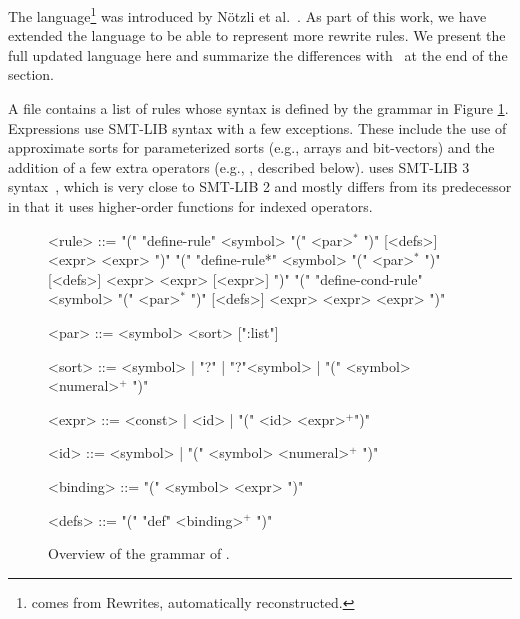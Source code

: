 The \dsl language\footnote{\dsl comes from {\sc R}ewrites, {\sc a}utomatically
{\sc re}constructed.} was introduced by N\"otzli et al.~\cite{notzli2022reconstructing}.
As part of this work, we have extended the language to be able to
represent more rewrite rules.  We present the full updated language here and
summarize the differences with~\cite{notzli2022reconstructing} at the end of the
section.

A \dsl file contains a list of rules whose syntax is defined by the grammar in Figure \ref{fig:grammar}.
Expressions use SMT-LIB syntax with a few exceptions.
These include the use of approximate sorts for parameterized sorts (e.g.,
arrays and bit-vectors) and the addition of a few extra operators (e.g.,
, described below). \dsl uses SMT-LIB 3
syntax~\cite{smtlib3}, which is very close to SMT-LIB 2 and mostly differs from
its predecessor in that it uses higher-order functions for indexed operators. 

\begin{figure}[t]
    \renewcommand{\ulitleft}{\small \ttfamily \bfseries}
    \renewcommand{\ulitright}{}
    \begin{grammar}
      <rule> ::= "(" "define-rule" <symbol> "(" <par>$^*$ ")" [<defs>] <expr> <expr> ")"
      \alt "(" "define-rule*" <symbol> "(" <par>$^*$ ")" [<defs>] <expr> <expr> [<expr>] ")"
      \alt "(" "define-cond-rule" <symbol> "(" <par>$^*$ ")" [<defs>] <expr> <expr> <expr> ")"

      <par> ::= <symbol> <sort> [":list"]

      <sort> ::= <symbol> | "?" | "?"<symbol> | "(" <symbol> <numeral>$^+$ ")"

      <expr> ::= <const> | <id> | "(" <id> <expr>$^+$")"

      <id> ::= <symbol> | "(" <symbol> <numeral>$^+$ ")"

      <binding> ::= "(" <symbol> <expr> ")"

      <defs> ::= "(" "def" <binding>$^+$ ")"
    \end{grammar}

    \caption{Overview of the grammar of \dsl.}
    \label{fig:grammar}
\end{figure}

